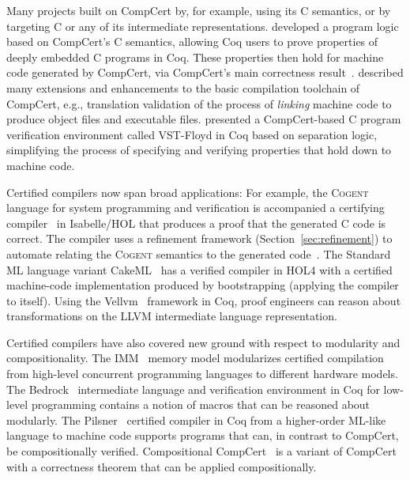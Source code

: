 Many projects built on CompCert by, for example, using its C semantics, or by targeting C or any of its intermediate representations.
\cite{Appel2011} developed a program logic based on CompCert's C semantics, allowing Coq users to prove properties of deeply embedded C programs in Coq. These properties then hold for machine code generated by CompCert, via CompCert's main correctness result~\citep{Appel:BOOK14}. \cite{Kaestner2017} described many extensions and enhancements to the basic compilation toolchain of CompCert, e.g., translation validation of the process of \emph{linking} machine code to produce object files and executable files. \cite{Cao2018} presented a CompCert-based C program verification environment called VST-Floyd in Coq based on separation logic, simplifying the process of specifying and verifying properties that hold down to machine code.

Certified compilers now span broad applications:
For example, the \textsc{Cogent} language for system programming and verification is accompanied a certifying compiler~\citep{oconnor2016b} 
in Isabelle/HOL that produces a proof that the generated C code is correct. The compiler uses a refinement framework (Section~\ref{sec:refinement}) to
automate relating the \textsc{Cogent} semantics to the generated code~\citep{Rizkallah16}.
The Standard ML language variant CakeML~\citep{Kumar2014} has a verified compiler in HOL4
with a certified machine-code implementation produced by bootstrapping (applying the compiler to itself).
Using the Vellvm~\citep{zhao2012} framework in Coq, proof engineers can reason about transformations on the LLVM intermediate language representation.

Certified compilers have also covered new ground with respect to modularity and compositionality.
The IMM~\citep{Podkopaev2019} memory model modularizes certified compilation from high-level concurrent programming languages to different hardware models.
The Bedrock~\citep{Chlipala2013} intermediate language and verification environment in Coq for low-level programming
contains a notion of macros that can be reasoned about modularly.
The Pilsner~\citep{Neis2015} certified compiler in Coq from a higher-order ML-like language to machine code
supports programs that can, in contrast to CompCert, be compositionally verified.
Compositional CompCert~\citep{Stewart2015} is a variant of CompCert with a correctness theorem that can be applied compositionally. 

